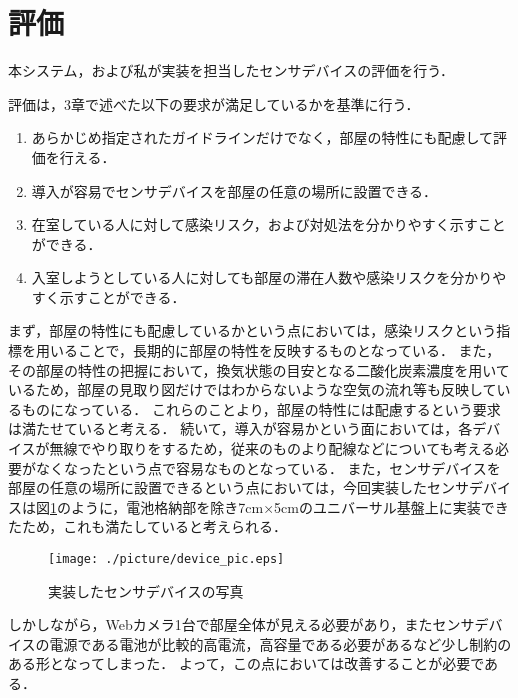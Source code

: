 

\section{評価}

本システム，および私が実装を担当したセンサデバイスの評価を行う．

評価は，3章で述べた以下の要求が満足しているかを基準に行う．
\begin{enumerate}
    \item あらかじめ指定されたガイドラインだけでなく，部屋の特性にも配慮して評価を行える．
    \item 導入が容易でセンサデバイスを部屋の任意の場所に設置できる．
    \item 在室している人に対して感染リスク，および対処法を分かりやすく示すことができる．
    \item 入室しようとしている人に対しても部屋の滞在人数や感染リスクを分かりやすく示すことができる．
\end{enumerate}
まず，部屋の特性にも配慮しているかという点においては，感染リスクという指標を用いることで，長期的に部屋の特性を反映するものとなっている．
また，その部屋の特性の把握において，換気状態の目安となる二酸化炭素濃度を用いているため，部屋の見取り図だけではわからないような空気の流れ等も反映しているものになっている．
これらのことより，部屋の特性には配慮するという要求は満たせていると考える．
続いて，導入が容易かという面においては，各デバイスが無線でやり取りをするため，従来のものより配線などについても考える必要がなくなったという点で容易なものとなっている．
また，センサデバイスを部屋の任意の場所に設置できるという点においては，今回実装したセンサデバイスは図\ref{dev_pic}のように，電池格納部を除き7cm×5cmのユニバーサル基盤上に実装できたため，これも満たしていると考えられる．
\begin{figure}[htbp]
    \centering
    \texttt{[image: ./picture/device\_pic.eps]}
    \caption{実装したセンサデバイスの写真}
    \label{dev_pic}
\end{figure}
しかしながら，Webカメラ1台で部屋全体が見える必要があり，またセンサデバイスの電源である電池が比較的高電流，高容量である必要があるなど少し制約のある形となってしまった．
よって，この点においては改善することが必要である．
